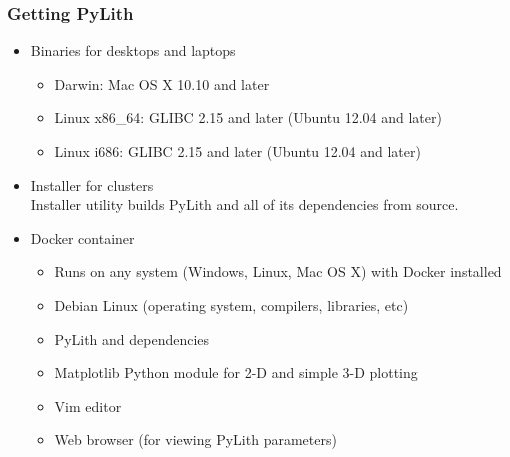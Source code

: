 \documentclass[aspectratio=169,hyperref=colorlinks]{beamer}
\begin{document}
\begin{frame}
  \frametitle{Getting PyLith}

  \begin{itemize}
  \item Binaries for desktops and laptops
    \begin{itemize}
    \item Darwin: Mac OS X 10.10 and later
    \item Linux x86\_64: GLIBC 2.15 and later (Ubuntu 12.04 and later)
    \item Linux i686: GLIBC 2.15 and later (Ubuntu 12.04 and later)
    \end{itemize}
  \item Installer for clusters \\
    Installer utility builds PyLith and all of its dependencies from source.
  \item Docker container
    \begin{itemize}
    \item Runs on any system (Windows, Linux, Mac OS X) with Docker installed
    \item Debian Linux (operating system, compilers, libraries, etc)
    \item PyLith and dependencies
    \item Matplotlib Python module for 2-D and simple 3-D plotting
    \item Vim editor
    \item Web browser (for viewing PyLith parameters)
    \end{itemize}
  \end{itemize}

\end{frame}
\end{document}
